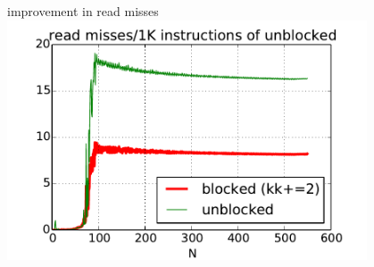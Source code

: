 
\begin{frame}{improvement in read misses}
\includegraphics[width=0.8\textwidth]{../caching/k-kk-novec-block-read_miss_rate}
\end{frame}

